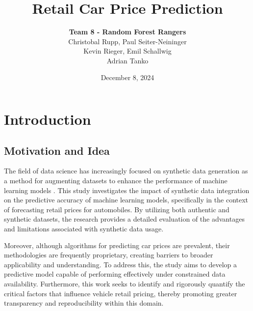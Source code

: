 \documentclass[a4paper,oneside,bibliography=totoc]{scrbook}
\renewcommand{\cleardoublepage}{}
\begin{document}
\frontmatter \subject{Project Paper} %
\title{Retail Car Price Prediction}
\author{\textbf{Team 8 - Random Forest Rangers}\\
		Christobal Rupp, Paul Seiter-Neininger\\
  		Kevin Rieger, Emil Schallwig\\
  		Adrian Tanko} 
\date{December 8, 2024}
\publishers{{\small Submitted to}\\
  Data and Web Science Group\\
  Dr. Sven Hertling\\
  Franz Krause\\
  Andreea Iana\\
  University of Mannheim\\}
\maketitle

\mainmatter

\patchcmd{\chapter}{\cleardoublepage}{}{}{}
\chapter{Introduction}
\label{cha:introduction}

\section{Motivation and Idea}
\label{sec:motivationAndIdea}

The field of data science has increasingly focused on synthetic data generation as a method for augmenting datasets to enhance the performance of machine learning models \cite{neves2022}. This study investigates the impact of synthetic data integration on the predictive accuracy of machine learning models, specifically in the context of forecasting retail prices for automobiles. By utilizing both authentic and synthetic datasets, the research provides a detailed evaluation of the advantages and limitations associated with synthetic data usage.

Moreover, although algorithms for predicting car prices are prevalent, their methodologies are frequently proprietary, creating barriers to broader applicability and understanding. To address this, the study aims to develop a predictive model capable of performing effectively under constrained data availability. Furthermore, this work seeks to identify and rigorously quantify the critical factors that influence vehicle retail pricing, thereby promoting greater transparency and reproducibility within this domain.
\end{document}
